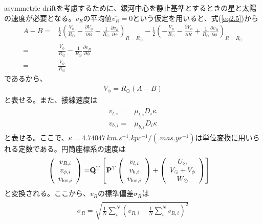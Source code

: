 asymmetric driftを考慮するために、銀河中心を静止基準とするときの星と太陽の速度が必要となる。$v_R$の平均値$\overline{v_R}=0$という仮定を用いると、式(\ref{eq2.5})から
\begin{align}
	A - B =& \frac{1}{2}\left( \frac{V_{\phi}}{R_{\odot}} - \frac{\partial V_{\phi}}{\partial R} - \frac{1}{R_{\odot}}\frac{\partial v_{R}}{\partial \phi} \right)_{R=R_{\odot}} - 
	\frac{1}{2}\left( -\frac{V_{\phi}}{R_{\odot}} - \frac{\partial V_{\phi}}{\partial R} + \frac{1}{R_{\odot}}\frac{\partial v_{R}}{\partial \phi} \right)_{R=R_{\odot}}\\
	=& \frac{V_{\phi}}{R_{\odot}} - \frac{1}{R_{\odot}}\frac{\partial v_{R}}{\partial \phi} \\
	=& \frac{V_{\phi}}{R_{\odot}}
\end{align}
であるから、
\begin{align}
	V_{\mathrm{\phi}} = R_{\odot}(A-B) \label{eq153}
\end{align}
と表せる。また、接線速度は
\begin{align}
\begin{aligned}
	v_{l,i} =& \mu_{l,i}D_i \kappa\\
	v_{b,i} =& \mu_{b,i}D_i \kappa
\end{aligned}
\end{align}
と表せる。ここで、$\kappa=4.74047\,\si{km.s^{-1}.kpc^{-1}/(.mas.yr^{-1})}$は単位変換に用いられる定数である。円筒座標系の速度は
\begin{align}
\begin{aligned}
	\left(
	\begin{array}{c}
	 	v_{R,i}\\
		v_{\phi,i}\\
		v_{\mathrm{los},i}
	\end{array}
	\right)
	=& \bf{Q}^{\mathrm{T}} \left[\bf{P}^{\mathrm{T}}
	\left(
	\begin{array}{c}
	 	v_{l,i}\\
		v_{b,i}\\
		v_{\mathrm{los},i}
	\end{array}
	\right)
	+\left(
	\begin{array}{c}
	 	U_{\odot}\\
		V_{\odot} + V_{\mathrm{\phi}}\\
		W_{\odot}
	\end{array}
	\right)
	\right]
\end{aligned}
\end{align}
と変換される。ここから、$v_R$の標準偏差$\sigma_R$は
\begin{align}
\begin{aligned}
	\sigma_R = \sqrt{\frac{1}{N}\sum^N_i(v_{R,i} - \frac{1}{N}\sum^N_i v_{R,i})^2}
\end{aligned}
\end{align}
